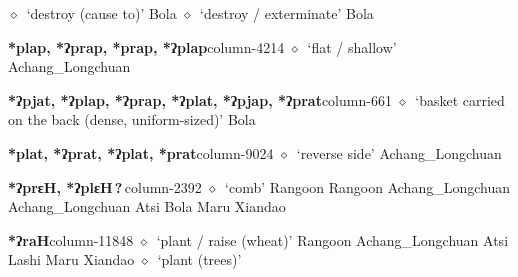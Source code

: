          $\diamond$~`destroy (cause to)'
         Bola 
\hspace{1ex}
         $\diamond$~`destroy / exterminate'
         Bola 
  \item {\footnotesize \textbf{*plap, *ʔprap, *prap, *ʔplap}}{\tiny column-4214}
         $\diamond$~`flat / shallow'
         Achang\_Longchuan 
  \item {\footnotesize \textbf{*ʔpjat, *ʔplap, *ʔprap, *ʔplat, *ʔpjap, *ʔprat}}{\tiny column-661}
         $\diamond$~`basket carried on the back (dense, uniform-sized)'
         Bola 
  \item {\footnotesize \textbf{*plat, *ʔprat, *ʔplat, *prat}}{\tiny column-9024}
         $\diamond$~`reverse side'
         Achang\_Longchuan 
  \item {\footnotesize \textbf{*ʔprɛH, *ʔplɛH\,?\,}}{\tiny column-2392}
         $\diamond$~`comb'
         Rangoon 
\hspace{1ex}
         Rangoon 
\hspace{1ex}
         Achang\_Longchuan 
\hspace{1ex}
         Achang\_Longchuan 
\hspace{1ex}
         Atsi 
\hspace{1ex}
         Bola 
\hspace{1ex}
         Maru 
\hspace{1ex}
         Xiandao 
  \item {\footnotesize \textbf{*ʔraH}}{\tiny column-11848}
         $\diamond$~`plant / raise (wheat)'
         Rangoon 
\hspace{1ex}
         Achang\_Longchuan 
\hspace{1ex}
         Atsi 
\hspace{1ex}
         Lashi 
\hspace{1ex}
         Maru 
\hspace{1ex}
         Xiandao 
\hspace{1ex}
         $\diamond$~`plant (trees)'
